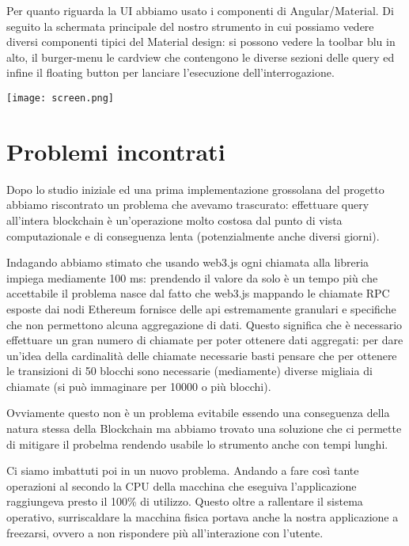 Per quanto riguarda la UI abbiamo usato i componenti di Angular/Material.
Di seguito la schermata principale del nostro strumento in cui possiamo vedere diversi componenti tipici del Material design:
si possono vedere la toolbar blu in alto, il burger-menu le cardview che contengono le diverse sezioni delle query ed infine il floating button per lanciare l'esecuzione dell'interrogazione.

\begin{center}
    \texttt{[image: screen.png]}
\end{center}

\section{Problemi incontrati}
Dopo lo studio iniziale ed una prima implementazione grossolana del progetto abbiamo riscontrato un problema che avevamo trascurato:
effettuare query all'intera blockchain è un'operazione molto costosa dal punto di vista computazionale e di conseguenza lenta (potenzialmente anche diversi giorni).

Indagando abbiamo stimato che usando web3.js ogni chiamata alla libreria impiega mediamente 100 ms:
prendendo il valore da solo è un tempo più che accettabile il problema nasce dal fatto che web3.js mappando le chiamate RPC esposte dai nodi Ethereum
fornisce delle api estremamente granulari e specifiche che non permettono alcuna aggregazione di dati.
Questo significa che è necessario effettuare un gran numero di chiamate per poter ottenere dati aggregati:
per dare un'idea della cardinalità delle chiamate necessarie basti pensare che per ottenere le transizioni di 50 blocchi sono necessarie (mediamente) diverse migliaia di chiamate (si può immaginare per 10000 o più blocchi).

Ovviamente questo non è un problema evitabile essendo una conseguenza della natura stessa della Blockchain ma abbiamo trovato una soluzione che ci permette di mitigare il probelma rendendo usabile lo strumento anche con tempi lunghi.

\vspace{0.5cm}

Ci siamo imbattuti poi in un nuovo problema. Andando a fare così tante operazioni al secondo la CPU della macchina che eseguiva l'applicazione raggiungeva presto il 100\% di utilizzo.
Questo oltre a rallentare il sistema operativo, surriscaldare la macchina fisica portava anche la nostra applicazione a freezarsi, ovvero a non rispondere più all'interazione con l'utente.

